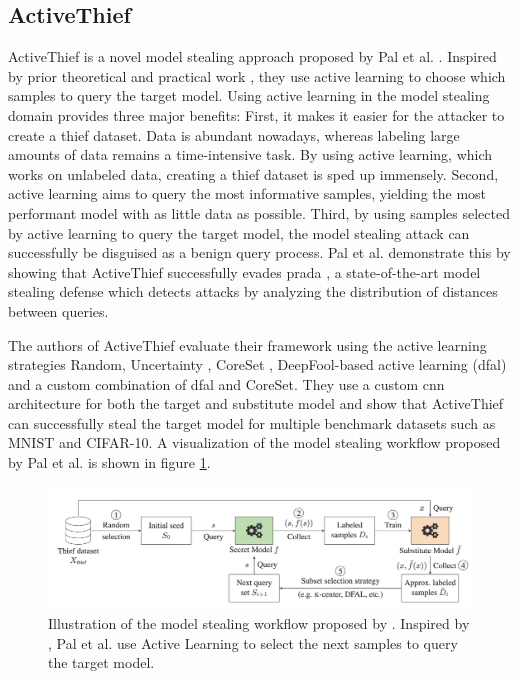 \subsection{ActiveThief}
\label{sec:Related_work:Model_Stealing:ActiveThief}
ActiveThief is a novel model stealing approach proposed by Pal et al. \cite{pal2020activethief}. Inspired by prior theoretical \cite{chandrasekaran2020exploring}
and practical work \cite{shi2018active}, they use active learning to choose which samples to query the target model. Using active learning in the model stealing
domain provides three major benefits: First, it makes it easier for the attacker to create a thief dataset. Data is abundant nowadays, whereas labeling large amounts
of data remains a time-intensive task. By using active learning, which works on unlabeled data, creating a thief dataset is sped up immensely.
Second, active learning aims to query the most informative samples, yielding the most performant model with as little data as possible. Third, by using samples selected
by active learning to query the target model, the model stealing attack can successfully be disguised as a benign query process. Pal et al. demonstrate this by showing 
that ActiveThief successfully evades \gls{prada} \cite{juuti2019prada}, a state-of-the-art model stealing defense which detects attacks by analyzing the distribution of distances
between queries. \par
The authors of ActiveThief evaluate their framework using the active learning strategies Random, Uncertainty \cite{lewis1995sequential}, CoreSet \cite{sener2017active},
DeepFool-based active learning (\gls{dfal}) \cite{ducoffe2018adversarial} and a custom combination of \gls{dfal} and CoreSet. They use a custom \gls{cnn} architecture
for both the target and substitute model and show that ActiveThief can successfully steal the target model for multiple benchmark datasets such as MNIST and CIFAR-10.
A visualization of the model stealing workflow proposed by Pal et al. is shown in figure \ref{fig:ActiveThief}.

\begin{figure} [ht]
    \centering
    \includegraphics[width=.9\linewidth]{images/ActiveThief_Idea.png}
    \caption[Visualization of ActiveThief]{Illustration of the model stealing workflow proposed by \cite{pal2020activethief}. Inspired by
    \cite{chandrasekaran2020exploring}, Pal et al. use Active Learning to select the next samples to query the target model.}
    \label{fig:ActiveThief}
\end{figure}

